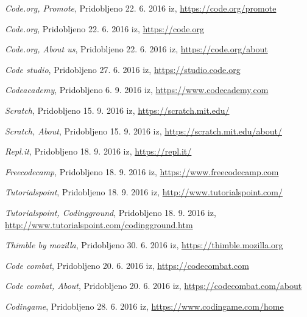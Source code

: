 \begin{thebibliography}{100}
 \emph{Code.org, Promote}, Pridobljeno
  22. 6. 2016 iz, \url{https://code.org/promote}

 \emph{Code.org}, Pridobljeno
  22. 6. 2016 iz, \url{https://code.org}

 \emph{Code.org, About us}, Pridobljeno
  22. 6. 2016 iz, \url{https://code.org/about}

 \emph{Code studio}, Pridobljeno
  27. 6. 2016 iz, \url{https://studio.code.org}

 \emph{Codeacademy}, Pridobljeno 6. 9. 2016 iz,
  \url{https://www.codecademy.com}

 \emph{Scratch}, Pridobljeno 15. 9. 2016 iz,
  \url{https://scratch.mit.edu/}

 \emph{Scratch, About}, Pridobljeno 15. 9. 2016 iz,
  \url{https://scratch.mit.edu/about/}

 \emph{Repl.it}, Pridobljeno 18. 9. 2016 iz,
  \url{https://repl.it/}

 \emph{Freecodecamp}, Pridobljeno 18. 9. 2016 iz,
  \url{https://www.freecodecamp.com}

 \emph{Tutorialspoint}, Pridobljeno 18. 9. 2016 iz,
  \url{http://www.tutorialspoint.com/}

 \emph{Tutorialspoint,
    Codingground}, Pridobljeno 18. 9. 2016 iz,
  \url{http://www.tutorialspoint.com/codingground.htm}

 \emph{Thimble by mozilla}, Pridobljeno
  30. 6. 2016 iz, \url{https://thimble.mozilla.org}

 \emph{Code combat}, Pridobljeno 20. 6. 2016 iz,
  \url{https://codecombat.com}

 \emph{Code combat, About}, Pridobljeno
  20. 6. 2016 iz, \url{https://codecombat.com/about}

 \emph{Codingame}, Pridobljeno 28. 6. 2016 iz,
  \url{https://www.codingame.com/home}

\end{thebibliography}


